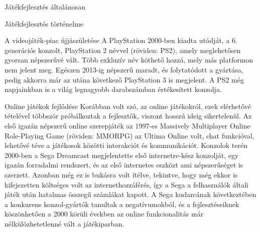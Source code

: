 \begin{MyChapter}{Játékfejlesztés általánosan}
\begin{MySection}{Játékfejlesztés történelme}
\begin{MySubSection}{A videojáték-piac újjászületése}
			A PlayStation 2000-ben kiadta utódját, a 6. generációs konzolt, PlayStation 2 névvel (röviden: PS2), amely meglehetősen gyorsan népszerűvé vált. Több exkluzív név köthető hozzá, mely más platformon nem jelent meg. Egészen 2013-ig népszerű maradt, és folytatódott a gyártása, pedig akkorra már az utána következő PlayStation 3 is megjelent. A PS2 még napjainkban is a világ legnagyobb darabszámban értékesített konzolja.
			\cite{playstation}
		\end{MySubSection}
		
		\begin{MySubSection}{Online játékok fejlődése}
			Korábban volt szó, az online játékokról, ezek elérhetővé tételével többször próbálkoztak a fejlesztők, viszont hosszú ideig sikertelenül. Az első igazán népszerű online szerepjáték az 1997-es Massively Multiplayer Online Role-Playing Game (röviden: MMORPG) az Ultima Online volt, chat funkcióval, lehetővé téve a játékosok közötti interakciót és kommunikációt. Konzolok terén 2000-ben a Sega Dreamcast megjelentette első internetre-kész konzolját, egy igazán forradalmi rendszert, és az első internetes eszközt ami népszerűséget is szerzett. Azonban még ez is bukásra volt ítélve, tekintve, hogy még ekkor is kifejezetten költséges volt az internethozzáférés, így a Sega a felhasználók általi játék után hatalmas összegű számlákat kapott. A Sega kudarcának következtében a konkurens konzol-gyártók tanultak a negatívumokból, és a fejlesztéseiknek köszönhetően a 2000 körüli években az online funkcionalitás már nélkülözhetetlenné vált a játékiparban.
			\cite{mmorpg}
		\end{MySubSection}
		

\end{MySection}
\end{MyChapter}
